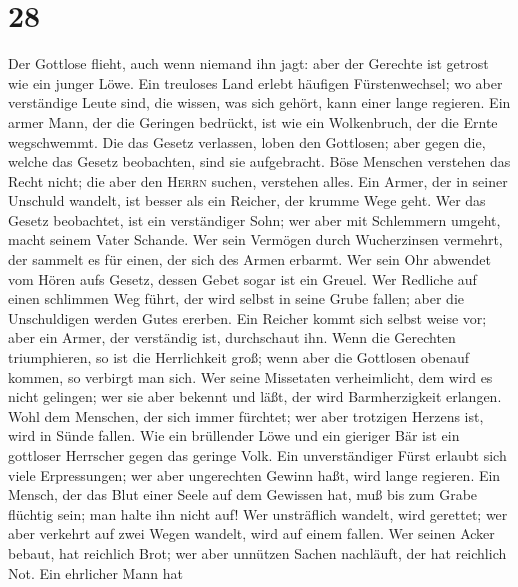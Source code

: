 \hypertarget{section-27}{%
\section{28}\label{section-27}}

 Der Gottlose flieht, auch wenn niemand ihn jagt: aber der
Gerechte ist getrost wie ein junger Löwe.  Ein treuloses
Land erlebt häufigen Fürstenwechsel; wo aber verständige Leute sind, die
wissen, was sich gehört, kann einer lange regieren.  Ein
armer Mann, der die Geringen bedrückt, ist wie ein Wolkenbruch, der die
Ernte wegschwemmt.  Die das Gesetz verlassen, loben den
Gottlosen; aber gegen die, welche das Gesetz beobachten, sind sie
aufgebracht.  Böse Menschen verstehen das Recht nicht; die
aber den \textsc{Herrn} suchen, verstehen alles.  Ein
Armer, der in seiner Unschuld wandelt, ist besser als ein Reicher, der
krumme Wege geht.  Wer das Gesetz beobachtet, ist ein
verständiger Sohn; wer aber mit Schlemmern umgeht, macht seinem Vater
Schande.  Wer sein Vermögen durch Wucherzinsen vermehrt,
der sammelt es für einen, der sich des Armen erbarmt.  Wer
sein Ohr abwendet vom Hören aufs Gesetz, dessen Gebet sogar ist ein
Greuel.  Wer Redliche auf einen schlimmen Weg führt, der
wird selbst in seine Grube fallen; aber die Unschuldigen werden Gutes
ererben.  Ein Reicher kommt sich selbst weise vor; aber
ein Armer, der verständig ist, durchschaut ihn.  Wenn die
Gerechten triumphieren, so ist die Herrlichkeit groß; wenn aber die
Gottlosen obenauf kommen, so verbirgt man sich.  Wer
seine Missetaten verheimlicht, dem wird es nicht gelingen; wer sie aber
bekennt und läßt, der wird Barmherzigkeit erlangen.  Wohl
dem Menschen, der sich immer fürchtet; wer aber trotzigen Herzens ist,
wird in Sünde fallen.  Wie ein brüllender Löwe und ein
gieriger Bär ist ein gottloser Herrscher gegen das geringe Volk.
 Ein unverständiger Fürst erlaubt sich viele
Erpressungen; wer aber ungerechten Gewinn haßt, wird lange regieren.
 Ein Mensch, der das Blut einer Seele auf dem Gewissen
hat, muß bis zum Grabe flüchtig sein; man halte ihn nicht auf!
 Wer unsträflich wandelt, wird gerettet; wer aber
verkehrt auf zwei Wegen wandelt, wird auf einem fallen. 
Wer seinen Acker bebaut, hat reichlich Brot; wer aber unnützen Sachen
nachläuft, der hat reichlich Not.  Ein ehrlicher Mann hat
